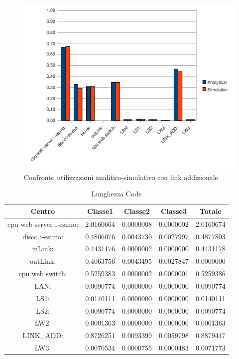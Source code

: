 \begin{figure}[H]
\begin{center}
\includegraphics[scale=0.8]{etc/utilizzazione_link_add.png}
\caption{Confronto utilizzazioni analitico-simulativo con link addizionale}
\label{confronto link add}
\end{center}
\end{figure}
\begin{table}[H]
\begin{center}
\begin{tabular}{||c|c|c|c|c||}
\hline
Centro &Classe1 &Classe2 &Classe3 &Totale\\
\hline
\hline
 cpu web server i-esimo: 	&2.0160664	&0.0000008	&0.0000002	&2.0160674	\\\hline
 disco i-esimo: 	&0.4806076	&0.0043730	&0.0027997	&0.4877803	\\\hline
 inLink: 	&0.4431176	&0.0000002	&0.0000000	&0.4431178	\\\hline
 outLink: 	&0.4063756	&0.0043495	&0.0027847	&0.0000000	\\\hline
 cpu web switch: 	&0.5259383	&0.0000002	&0.0000001	&0.5259386	\\\hline
 LAN: 	&0.0090774	&0.0000000	&0.0000000	&0.0090774	\\\hline
 LS1: 	&0.0140111	&0.0000000	&0.0000000	&0.0140111	\\\hline
 LS2: 	&0.0090774	&0.0000000	&0.0000000	&0.0090774	\\\hline
 LW2: 	&0.0001363	&0.0000000	&0.0000000	&0.0001363	\\\hline
 LINK\_ADD: 	&0.8726251	&0.0093399	&0.0059798	&0.8879447	\\\hline
 LW3: 	&0.0070534	&0.0000755	&0.0000483	&0.0071773	\\\hline
\end{tabular}
\end{center}
\caption{Lunghezza Code}
\label{lunghezzacode}
\end{table}
